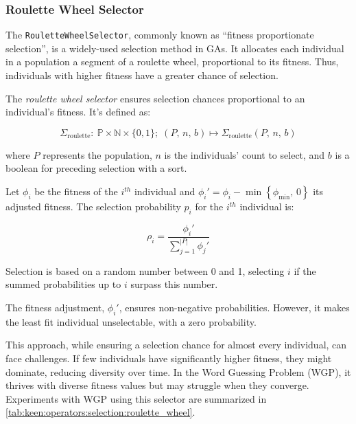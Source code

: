 \subsubsection{Roulette Wheel Selector}
\label{sec:keen:operators:selection:roulette_wheel}
  The \texttt{RouletteWheelSelector}, commonly known as \enquote{fitness 
  proportionate selection}, is a widely-used selection method in GAs.
  It allocates each individual in a population a segment of a roulette wheel, 
  proportional to its fitness.
  Thus, individuals with higher fitness have a greater chance of selection.

  \begin{definition}
    The \emph{roulette wheel selector} ensures selection chances proportional to 
    an individual's fitness.
    It's defined as:

    \begin{equation}
      \Sigma_\mathrm{roulette} :\: 
        \mathbb{P} \times \mathbb{N} \times \{0, 1\};\;
      (P,\, n,\, b) \mapsto \Sigma_\mathrm{roulette}(P,\, n,\, b)
    \end{equation}

    where \(P\) represents the population, \(n\) is the individuals' count to 
    select, and \(b\) is a boolean for preceding selection with a sort.

    Let \(\phi_i\) be the fitness of the \(i^{th}\) individual and \(\phi_i' =  
    \phi_i - \min\left\{\phi_\mathrm{min},\, 0\right\}\) its adjusted fitness. 
    The selection probability \(p_i\) for the \(i^{th}\) individual is:

    \begin{equation}
      \rho_i = \frac{\phi_i'}{\sum_{j=1}^{|P|} \phi_j'}
    \end{equation}

    Selection is based on a random number between 0 and 1, selecting \(i\) if 
    the summed probabilities up to \(i\) surpass this number.
  \end{definition}

  \begin{remark}
    The fitness adjustment, \(\phi_i'\), ensures non-negative probabilities. 
    However, it makes the least fit individual unselectable, with a zero 
    probability.
  \end{remark}

  This approach, while ensuring a selection chance for almost every individual, 
  can face challenges.
  If few individuals have significantly higher fitness, they might dominate, 
  reducing diversity over time.
  In the Word Guessing Problem (WGP), it thrives with diverse fitness values but 
  may struggle when they converge.
  Experiments with WGP using this selector are summarized in 
  \vref{tab:keen:operators:selection:roulette_wheel}.
